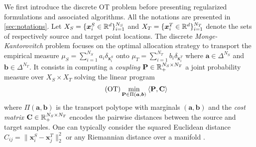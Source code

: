 We first introduce the discrete OT problem before presenting regularized formulations and associated algorithms.
All the notations are presented in \cref{sec:notations}.
Let $X_S = \{ \bm{x}_i^S \in \mathbb{R}^d \}_{i=1}^{N_S}$ and $X_T = \{ \bm{x}_i^T \in \mathbb{R}^d \}_{i=1}^{N_T}$ denote the sets of respectively source and target point locations. The discrete \emph{Monge-Kantorovitch} problem \cite{kantorovich1942transfer} focuses on the optimal allocation strategy to transport the empirical measure $\mu_S = \sum_{i=1}^{N_S} a_i  \delta_{\bm{x}_i^S}$ onto $\mu_T = \sum_{i=1}^{N_T} b_i  \delta_{\bm{x}_i^T}$ where $\bm{a} \in \Delta^{N_S}$ and $\bm{b} \in \Delta^{N_T}$. It consists in computing a \emph{coupling} ${\mathbf{P}} \in \mathbb{R}_{+}^{N_S \times N_T}$ \ie a joint probability measure over $X_S \times X_T$ solving the linear program
\begin{equation}
    \tag{OT}
    \label{eq:OT}
    \min_{{\mathbf{P}} \in \Pi(\bm{a}, \bm{b})} \: \langle {\mathbf{P}}, {\mathbf{C}} \rangle
\end{equation}
where $\Pi(\bm{a}, \bm{b})$ is the transport polytope with marginals $(\bm{a}, \bm{b})$ and the \emph{cost matrix} $\mathbf{C} \in \mathbb{R}_+^{N_S \times N_T}$ encodes the pairwise distances between the source and target samples. One can typically consider the squared Euclidean distance $C_{ij} = \|\bm{x}^S_{i}-\bm{x}^T_{j}\|_2^2$ or any Riemannian distance over a manifold \cite{villani2009optimal}.


